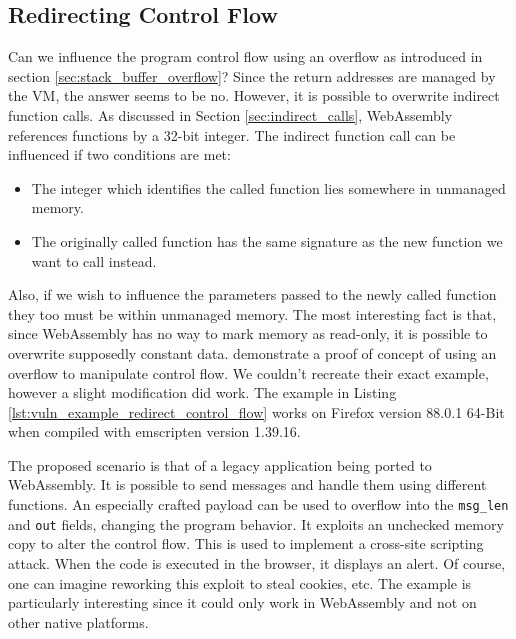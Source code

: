 \documentclass[sigconf]{acmart}
\begin{document}
\subsection{Redirecting Control Flow}
Can we influence the program control flow using an overflow as introduced in section \ref{sec:stack_buffer_overflow}? Since the return addresses are managed by the VM, the answer seems to be no. However, it is possible to overwrite indirect function calls. As discussed in Section \ref{sec:indirect_calls}, WebAssembly references functions by a 32-bit integer. The indirect function call can be influenced if two conditions are met:

\begin{itemize}
\item The integer which identifies the called function lies somewhere in unmanaged memory.
\item The originally called function has the same signature as the new function we want to call instead.
\end{itemize}

Also, if we wish to influence the parameters passed to the newly called function they too must be within unmanaged memory. The most interesting fact is that, since WebAssembly has no way to mark memory as read-only, it is possible to overwrite supposedly constant data. \citet{mcfadden_security_2018} demonstrate a proof of concept of using an overflow to manipulate control flow. We couldn't recreate their exact example, however a slight modification did work. The example in Listing \ref{lst:vuln_example_redirect_control_flow} works on Firefox version 88.0.1 64-Bit when compiled with emscripten version 1.39.16.

The proposed scenario is that of a legacy application being ported to WebAssembly. It is possible to send messages and handle them using different functions. An especially crafted payload can be used to overflow into the \texttt{msg\_len} and \texttt{out} fields, changing the program behavior. It exploits an unchecked memory copy to alter the control flow. This is used to implement a cross-site scripting attack. When the code is executed in the browser, it displays an alert. Of course, one can imagine reworking this exploit to steal cookies, etc.
The example is particularly interesting since it could only work in WebAssembly and not on other native platforms.
\end{document}
